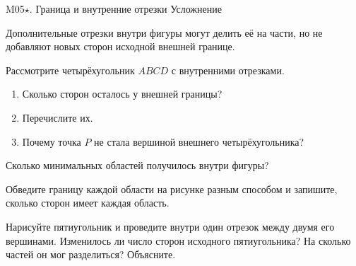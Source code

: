 \worksheettitle
  {M05\(\star\). Граница и внутренние отрезки}
  { Усложнение}

\studentnameblock

\begin{notebox}
  Дополнительные отрезки внутри фигуры могут делить её на части, но не
  добавляют новых сторон исходной внешней границе.
\end{notebox}

\quadrilateralregionsfigure

\begin{practicebox}
  Рассмотрите четырёхугольник $ABCD$ с внутренними отрезками.
  \begin{enumerate}[label=\alph*)]
    \item Сколько сторон осталось у внешней границы? \answerblank[15mm]
    \item Перечислите их. \answerblank[75mm]
    \item Почему точка $P$ не стала вершиной внешнего четырёхугольника?
  \end{enumerate}
\end{practicebox}

\begin{practicebox}
  Сколько минимальных областей получилось внутри фигуры?
  \answerblank[18mm]

  Обведите границу каждой области на рисунке разным способом и запишите,
  сколько сторон имеет каждая область. 
\end{practicebox}

\begin{checkpointbox}[Исследование]
  Нарисуйте пятиугольник и проведите внутри один отрезок между двумя его
  вершинами. Изменилось ли число сторон исходного пятиугольника? На сколько
  частей он мог разделиться? Объясните. 
\end{checkpointbox}
